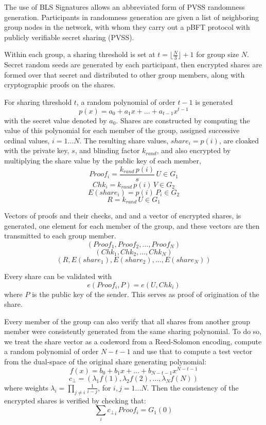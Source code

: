 \documentclass{yellowpaper}
\begin{document}
The use of BLS Signatures allows an abbreviated form of PVSS randomness generation. Participants in randomness generation are given a list of neighboring group nodes in the network, with whom they carry out a pBFT protocol with publicly verifiable secret sharing (PVSS). 

Within each group, a sharing threshold is set at $t = \lfloor \frac{N}{3} \rfloor + 1$ for group size $N$. Secret random seeds are generated by each participant, then encrypted shares are formed over that secret and distributed to other group members, along with cryptographic proofs on the shares.

For sharing threshold $t$, a random polynomial of order $t-1$ is generated $$p(x) = a_0 + a_1 x + ... + a_{t-1} x^{t-1}$$ with the secret value denoted by $a_0$.  Shares are constructed by computing the value of this polynomial for each member of the group, assigned successive ordinal values, $i = 1 ... N$. The resulting share values, $share_i = p(i)$, are cloaked with the private key, $s$, and blinding factor $k_{rand}$, and also encrypted by multiplying the share value by the public key of each member, 
$$Proof_i = \frac{k_{rand} \, p(i)}{s} \, U \in G_1$$
$$Chk_i = k_{rand}\, p(i)\,  V \in G_2$$
$$E(share_i) = p(i) \, P_i \in G_2$$
$$R = k_{rand} \, U \in G_1$$

Vectors of proofs and their checks, and and a vector of encrypted shares, is generated, one element for each member of the group, and these vectors are then transmitted to each group member.
$$ (Proof_1, Proof_2, ..., Proof_N)$$
$$(Chk_1, Chk_2, ..., Chk_N)$$
$$(R, E(share_1), E(share_2), ..., E(share_N))$$

Every share can be validated with
$$e(Proof_i, P) = e(U, Chk_i)$$
where $P$ is the public key of the sender. This serves as proof of origination of the share.

Every member of the group can also verify that all shares from another group member were consistently generated from the same sharing polynomial. To do so, we treat the share vector as a codeword from a Reed-Solomon encoding\cite{scrape}, compute a random polynomial of order $N - t - 1$ and use that to compute a test vector from the dual-space of the original share generating polynomial:
$$f(x) = b_0 + b_1 x + ... + b_{N-t-1} x^{N-t-1}$$
$$c_{\perp} = (\lambda_1 f(1), \lambda_2 f(2), ... , \lambda_N f(N))$$
where weights $\lambda_i = \prod_{j \ne i} \frac{1}{i-j}$, for $ i,j = 1...N$.
Then the consistency of the encrypted shares is verified by checking that:
$$\sum_i {c_{\perp}}_i \, Proof_i = G_1(0)$$
\end{document}
